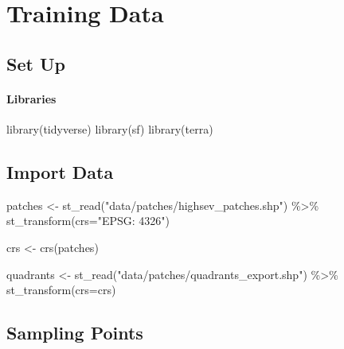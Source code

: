 \documentclass[
]{book}
\newenvironment{Shaded}{\begin{snugshade}}{\end{snugshade}}
\newcommand{\AttributeTok}[1]{\textcolor[rgb]{0.77,0.63,0.00}{#1}}
\newcommand{\FunctionTok}[1]{\textcolor[rgb]{0.00,0.00,0.00}{#1}}
\newcommand{\NormalTok}[1]{#1}
\newcommand{\OtherTok}[1]{\textcolor[rgb]{0.56,0.35,0.01}{#1}}
\newcommand{\SpecialCharTok}[1]{\textcolor[rgb]{0.00,0.00,0.00}{#1}}
\newcommand{\StringTok}[1]{\textcolor[rgb]{0.31,0.60,0.02}{#1}}
\begin{document}
\hypertarget{training-data}{%
\chapter{Training Data}\label{training-data}}

\hypertarget{set-up-3}{%
\section{Set Up}\label{set-up-3}}

\hypertarget{libraries-3}{%
\subsubsection{Libraries}\label{libraries-3}}

\begin{Shaded}
\begin{Highlighting}[]
\FunctionTok{library}\NormalTok{(tidyverse)}
\FunctionTok{library}\NormalTok{(sf)}
\FunctionTok{library}\NormalTok{(terra)}
\end{Highlighting}
\end{Shaded}

\hypertarget{import-data}{%
\section{Import Data}\label{import-data}}

\begin{Shaded}
\begin{Highlighting}[]
\NormalTok{patches }\OtherTok{\textless{}{-}} \FunctionTok{st\_read}\NormalTok{(}\StringTok{"data/patches/highsev\_patches.shp"}\NormalTok{) }\SpecialCharTok{\%\textgreater{}\%} 
  \FunctionTok{st\_transform}\NormalTok{(}\AttributeTok{crs=}\StringTok{"EPSG: 4326"}\NormalTok{)}

\NormalTok{crs }\OtherTok{\textless{}{-}} \FunctionTok{crs}\NormalTok{(patches)}

\NormalTok{quadrants }\OtherTok{\textless{}{-}} \FunctionTok{st\_read}\NormalTok{(}\StringTok{"data/patches/quadrants\_export.shp"}\NormalTok{) }\SpecialCharTok{\%\textgreater{}\%} 
  \FunctionTok{st\_transform}\NormalTok{(}\AttributeTok{crs=}\NormalTok{crs)}
\end{Highlighting}
\end{Shaded}

\hypertarget{sampling-points}{%
\section{Sampling Points}\label{sampling-points}}
\end{document}
